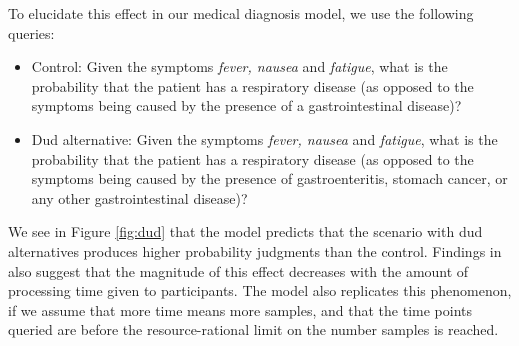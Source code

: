 To elucidate this effect in our medical diagnosis model, we use the following queries:
\begin{itemize}
\item Control: Given the symptoms \emph{fever, nausea} and \emph{fatigue}, what is the probability that the patient has a respiratory disease (as opposed to the symptoms being caused by the presence of a gastrointestinal disease)?
\item Dud alternative: Given the symptoms \emph{fever, nausea} and \emph{fatigue}, what is the probability that the patient has a respiratory disease (as opposed to the symptoms being caused by the presence of gastroenteritis, stomach cancer, or any other gastrointestinal disease)?
\end{itemize}
We see in Figure \ref{fig:dud} that the model predicts that the scenario with dud alternatives produces higher probability judgments than the control. Findings in \cite{dud} also suggest that the magnitude of this effect decreases with the amount of processing time given to participants. The model also replicates this phenomenon, if we assume that more time means more samples, and that the time points queried are before the resource-rational limit on the number samples is reached.


